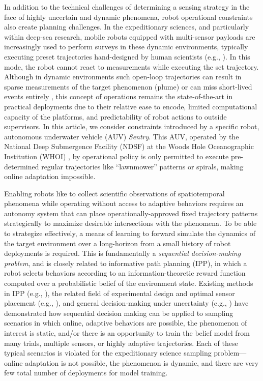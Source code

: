 In addition to the technical challenges of determining a sensing strategy in the face of highly uncertain and dynamic phenomena, robot operational constraints also create planning challenges. In the expeditionary sciences, and particularly within deep-sea research, mobile robots equipped with multi-sensor payloads are increasingly used to perform surveys in these dynamic environments, typically executing preset trajectories hand-designed by human scientists (e.g., \cite{camilli2010tracking}). In this mode, the robot cannot react to measurements while executing the set trajectory. Although in dynamic environments such open-loop trajectories can result in sparse measurements of the target phenomenon (plume) or can miss short-lived events entirely \cite{flaspohler2019information}, this concept of operations remains the state-of-the-art in practical deployments due to their relative ease to encode, limited computational capacity of the platforms, and predictability of robot actions to outside supervisors. In this article, we consider constraints introduced by a specific robot, autonomous underwater vehicle (AUV) \emph{Sentry}. This AUV, operated by the National Deep Submergence Facility (NDSF) at the Woods Hole Oceanographic Institution (WHOI) \cite{kaiser2016design}, by operational policy is only permitted to execute pre-determined regular trajectories like ``lawnmower'' patterns or spirals, making online adaptation impossible.

Enabling robots like \Sentry to collect scientific observations of spatiotemporal phenomena while operating without access to adaptive behaviors requires an autonomy system that can place operationally-approved fixed trajectory patterns strategically to maximize desirable intersections with the phenomena. To be able to strategize effectively, a means of learning to forward simulate the dynamics of the target environment over a long-horizon from a small history of robot deployments is required. This is fundamentally a \emph{sequential decision-making problem}, and is closely related to informative path planning (IPP), in which a robot selects behaviors according to an information-theoretic reward function computed over a probabilistic belief of the environment state. Existing methods in IPP (e.g., \cite{Hitz2017,hollinger2013sampling,flaspohler2019information,levine2010information,binney2012branch}), the related field of experimental design and optimal sensor placement (e.g., \cite{krause2008near,wang2019reinforcement}), and general decision-making under uncertainty (e.g., \cite{sunberg2018online, somani2013despot,kocsis2006bandit,Silver2010}) have demonstrated how sequential decision making can be applied to sampling scenarios in which online, adaptive behaviors are possible, the phenomenon of interest is static, and/or there is an opportunity to train the belief model from many trials, multiple sensors, or highly adaptive trajectories. Each of these typical scenarios is violated for the expeditionary science sampling problem---online adaptation is not possible, the phenomenon is dynamic, and there are very few total number of deployments for model training. 

